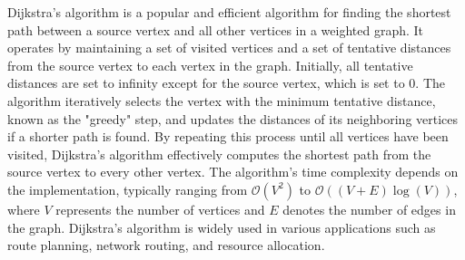 Dijkstra's algorithm is a popular and efficient algorithm for finding the shortest path between a source vertex and all other vertices in a weighted graph. It operates by maintaining a set of visited vertices and a set 
of tentative distances from the source vertex to each vertex in the graph. Initially, all tentative distances are set to infinity except for the source vertex, which is set to 0. The algorithm iteratively selects the vertex 
with the minimum tentative distance, known as the "greedy" step, and updates the distances of its neighboring vertices if a shorter path is found. By repeating this process until all vertices have been visited, Dijkstra's 
algorithm effectively computes the shortest path from the source vertex to every other vertex. The algorithm's time complexity depends on the implementation, typically ranging from $\mathcal{O}(V^2)$ to $\mathcal{O}((V+E)\log{(V)})$, 
where $V$ represents the number of vertices and $E$ denotes the number of edges in the graph. Dijkstra's algorithm is widely used in various applications such as route planning, network routing, and resource allocation.

